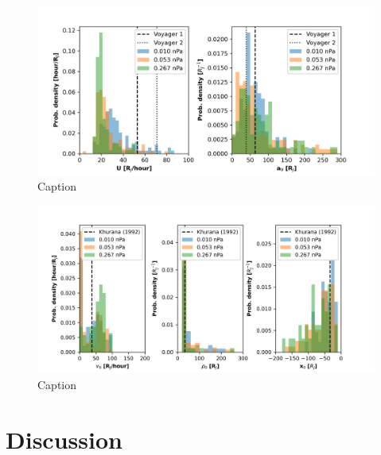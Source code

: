 \begin{figure}
    \centering
    \includegraphics[width=\textwidth]{images6/comparison_highdynP_behannon.png}
    \caption{Caption}
    \label{fig:comparison-hist-behannon}
\end{figure}

\begin{figure}
    \centering
    \includegraphics[width=\textwidth]{images6/comparison_highdynP_khurana.png}
    \caption{Caption}
    \label{fig:comparison-hist-khurana}
\end{figure}


\section{Discussion}